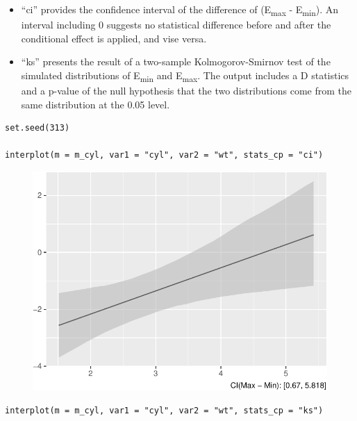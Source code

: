 \documentclass[
  article]{jss}
\begin{document}
\begin{itemize}
\item
  ``ci'' provides the confidence interval of the difference of
  (E\textsubscript{max} - E\textsubscript{min}). An interval including 0
  suggests no statistical difference before and after the conditional
  effect is applied, and vise versa.
\item
  ``ks'' presents the result of a two-sample Kolmogorov-Smirnov test of
  the simulated distributions of E\textsubscript{min} and
  E\textsubscript{max}. The output includes a D statistics and a p-value
  of the null hypothesis that the two distributions come from the same
  distribution at the 0.05 level.
\end{itemize}

\begin{verbatim}
set.seed(313)

interplot(m = m_cyl, var1 = "cyl", var2 = "wt", stats_cp = "ci")
\end{verbatim}

\begin{figure}[H]

{\centering \includegraphics{jss_manuscript_files/figure-pdf/unnamed-chunk-14-1.pdf}

}

\end{figure}

\begin{verbatim}
interplot(m = m_cyl, var1 = "cyl", var2 = "wt", stats_cp = "ks")
\end{verbatim}
\end{document}
